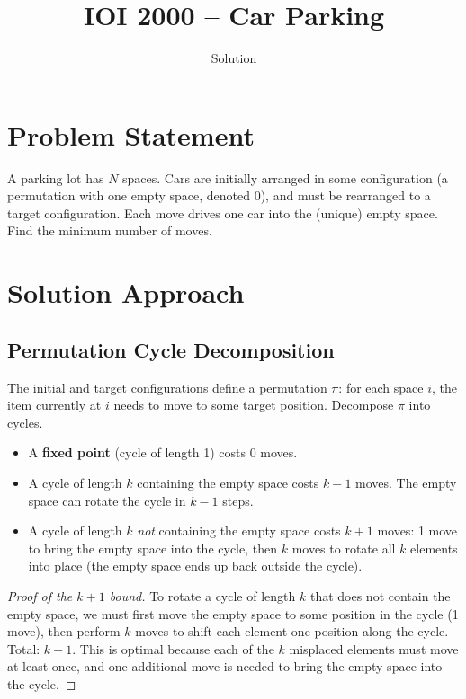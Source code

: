 \documentclass[11pt,a4paper]{article}
\title{IOI 2000 -- Car Parking}
\author{Solution}
\date{}
\begin{document}
\maketitle

\section{Problem Statement}

A parking lot has $N$ spaces. Cars are initially arranged in some configuration
(a permutation with one empty space, denoted 0), and must be rearranged to a target
configuration. Each move drives one car into the (unique) empty space.
Find the minimum number of moves.

\section{Solution Approach}

\subsection{Permutation Cycle Decomposition}

The initial and target configurations define a permutation $\pi$: for each space $i$,
the item currently at $i$ needs to move to some target position. Decompose $\pi$ into
cycles.

\begin{itemize}
  \item A \textbf{fixed point} (cycle of length 1) costs 0 moves.
  \item A cycle of length $k$ containing the empty space costs $k - 1$ moves.
        The empty space can rotate the cycle in $k - 1$ steps.
  \item A cycle of length $k$ \emph{not} containing the empty space costs $k + 1$ moves:
        1 move to bring the empty space into the cycle, then $k$ moves to rotate all
        $k$ elements into place (the empty space ends up back outside the cycle).
\end{itemize}

\begin{proof}[Proof of the $k + 1$ bound]
To rotate a cycle of length $k$ that does not contain the empty space, we must first
move the empty space to some position in the cycle (1 move), then perform $k$ moves
to shift each element one position along the cycle. Total: $k + 1$. This is optimal
because each of the $k$ misplaced elements must move at least once, and one additional
move is needed to bring the empty space into the cycle.
\end{proof}
\end{document}
